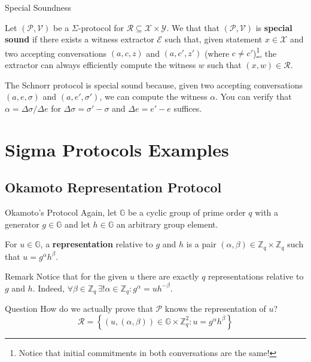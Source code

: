 \documentclass[xcolor={usenames,dvipsnames}]{beamer}
\begin{document}
    \begin{frame}{Special Soundness}
        \begin{definition}
            Let $(\mathcal{P}, \mathcal{V})$ be a $\Sigma$-protocol for $\mathcal{R} \subseteq \mathcal{X} \times \mathcal{Y}$. We that that $(\mathcal{P},\mathcal{V})$ is \textbf{special sound} if there exists a witness extractor $\mathcal{E}$ such that, given statement $x \in \mathcal{X}$ and two accepting conversations $(a,c,z)$ and $(a,c',z')$ (where $c \neq c'$)\footnote{Notice that initial commitments in both conversations are the same!}, the extractor can always efficiently compute the witness $w$ such that $(x,w) \in \mathcal{R}$.
        \end{definition}

        \begin{example}
            The Schnorr protocol is special sound because, given two accepting conversations $(a,e,\sigma)$ and $(a,e',\sigma')$, we can compute the witness $\alpha$. You can verify that $\alpha = \Delta \sigma / \Delta e$ for $\Delta \sigma = \sigma' - \sigma$ and $\Delta e = e' - e$ suffices.
        \end{example}
    \end{frame}

    \section{Sigma Protocols Examples}
    \subsection{Okamoto Representation Protocol}

    \begin{frame}{Okamoto's Protocol}
        Again, let $\mathbb{G}$ be a cyclic group of prime order $q$ with a generator $g \in \mathbb{G}$ and let $h \in \mathbb{G}$ an arbitrary group element.

        \begin{definition}
            For $u \in \mathbb{G}$, a \textbf{representation} relative to $g$ and $h$ is a pair $(\alpha,\beta) \in \mathbb{Z}_q \times \mathbb{Z}_q$ such that $u=g^{\alpha}h^{\beta}$.
        \end{definition}

        \begin{block}{Remark}
            Notice that for the given $u$ there are exactly $q$ representations relative to $g$ and $h$. Indeed, $\forall \beta \in \mathbb{Z}_q \, \exists! \alpha \in \mathbb{Z}_q: g^{\alpha} = uh^{-\beta}$. 
        \end{block}

        \begin{alertblock}{Question}
            How do we actually prove that $\mathcal{P}$ knows the representation of $u$?
            \begin{equation*}
                \mathcal{R} = \left\{ (u,(\alpha,\beta)) \in \mathbb{G} \times \mathbb{Z}_q^2: u = g^{\alpha}h^{\beta} \right\}
            \end{equation*}
        \end{alertblock}
    \end{frame}
\end{document}
